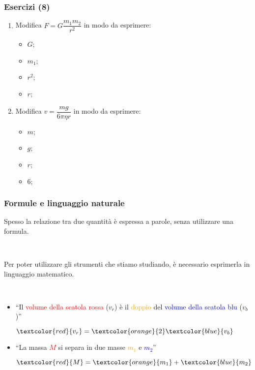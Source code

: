 \documentclass[]{beamer}
\begin{document}
\begin{frame}
\frametitle{Esercizi (8)}
\begin{enumerate}
  \item Modifica $ F = G \dfrac{m_1 m_2}{r^2} $ in modo da esprimere:
  \begin{multicols}{2}
    \begin{itemize}
        \item $ G $;
        \item $ m_1 $;
        \item $ r^2 $;
        \item $ r $;
    \end{itemize}
  \end{multicols}
  \item Modifica $ v = \dfrac{mg}{6\pi \eta r} $ in modo da esprimere:
  \begin{multicols}{2}
    \begin{itemize}
        \item $ m $;
        \item $ g $;
        \item $ r $;
        \item $ 6 $;
    \end{itemize}
  \end{multicols}
\end{enumerate}
\end{frame}


\begin{frame}
\frametitle{Formule e linguaggio naturale}
Spesso \alert<1>{la relazione tra due quantità è espressa a parole}, senza utilizzare una formula.\pause

~

Per poter utilizzare gli strumenti che stiamo studiando, è necessario \alert<2>{esprimerla in linguaggio matematico}.\pause

~

\begin{itemize}
  \item ``Il \textcolor{red}{volume della scatola rossa} ($ v_r $) è il \textcolor{orange}{doppio} del \textcolor{blue}{volume della scatola blu} ($ v_b $)''
  \begin{center}
  $ \textcolor{red}{v_r} = \textcolor{orange}{2} \textcolor{blue}{v_b} $
  \end{center}\pause
  \item ``La massa \textcolor{red}{$ M $} si separa in due masse \textcolor{orange}{$ m_1 $} e \textcolor{blue}{$ m_2 $}''
    \begin{center}
  $ \textcolor{red}{M} = \textcolor{orange}{m_1} + \textcolor{blue}{m_2} $
  \end{center}
\end{itemize}
\end{frame}
\end{document}
